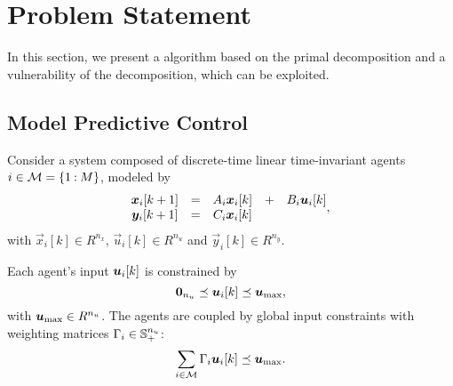\documentclass{ifacconf}  %
\begin{document}
\section{Problem Statement}\label{sec:PS}
In this section, we present a \dmpc{} algorithm based on the primal decomposition \citep{BoydEtAl2015} and a vulnerability of the decomposition, which can be exploited.

\subsection{Model Predictive Control}\label{ssec:MPC}
Consider a system composed of discrete-time linear time-invariant agents ${i\in\mathcal{M}=\{1\mathbin{:} M\}}$, modeled by
\begin{equation}
\begin{matrix}
  \label{eq:systems}
\vec{x}_{i}[k+1]&=&A_{i}\xik &+& B_{i}\uik\\
\vec{y}_{i}[k+1]&=&C_{i}\xik &&
\end{matrix},
\end{equation}
with ${\vec{x}_{i}[k]\in R^{n_{x}}}$, ${\vec{u}_{i}[k]\in R^{n_{u}}}$ and ${\vec{y}_{i}[k]\in R^{n_{y}}}$.

Each agent's input $\uik$ is constrained by
\begin{equation}
  \label{eq:u_local_constraints}
  \0_{n_{u}}\preceq\uik\preceq\vec{u}_{\max},
\end{equation}
with ${\boldsymbol{u}_{\mathrm{\max}}\in R^{n_{u}}}$.
The agents are coupled by global input constraints with weighting matrices ${\Gamma_{i}\in\mathbb{S}_{+}^{n_{u}}}$:
\begin{equation}
  \label{eq:global_constraint}
  \sum_{i\in\set{M}}\Gamma_{i}\uik\preceq\umax.
\end{equation}
\end{document}
